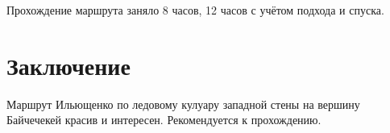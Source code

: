 \documentclass[fleqn, 10pt]{extarticle}
\begin{document}
	Прохождение маршрута заняло 8 часов, 12 часов с учётом подхода и спуска.

\section{Заключение}
	Маршрут Ильющенко по ледовому кулуару западной стены на вершину Байчечекей красив и интересен.
	Рекомендуется к прохождению.

\newpage
\nocite{*}


\end{document}
